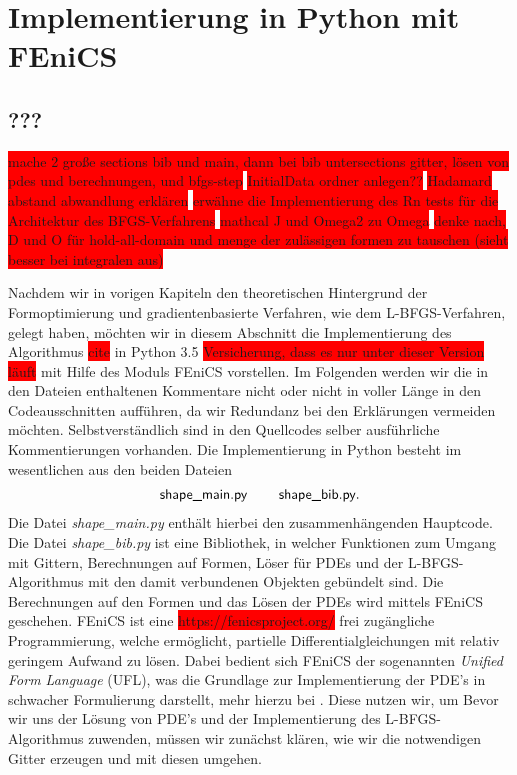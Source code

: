 
\section{Implementierung in Python mit FEniCS}
\subsection{???}

\colorbox{red}{mache 2 große sections bib und main, dann bei bib untersections gitter, lösen von pdes und berechnungen, und bfgs-step}
\colorbox{red}{InitialData ordner anlegen??}
\colorbox{red}{Hadamard abstand abwandlung erklären}
\colorbox{red}{erwähne die Implementierung des Rn tests für die Architektur des BFGS-Verfahrens}
\colorbox{red}{mathcal J und Omega2 zu Omega}
\colorbox{red}{denke nach, D und O für hold-all-domain und menge der zulässigen formen zu tauschen (sieht besser bei integralen aus)}

Nachdem wir in vorigen Kapiteln den theoretischen Hintergrund der Formoptimierung und gradientenbasierte Verfahren, wie dem L-BFGS-Verfahren, gelegt haben, möchten wir in diesem Abschnitt die Implementierung des Algorithmus \colorbox{red}{cite} in Python 3.5 \colorbox{red}{Versicherung, dass es nur unter dieser Version läuft} mit Hilfe des Moduls FEniCS vorstellen. Im Folgenden werden wir die in den Dateien enthaltenen Kommentare nicht oder nicht in voller Länge in den Codeausschnitten aufführen, da wir Redundanz bei den Erklärungen vermeiden möchten. Selbstverständlich sind in den Quellcodes selber ausführliche Kommentierungen vorhanden. Die Implementierung in Python besteht im wesentlichen aus den beiden Dateien
\begin{align*}
\textsf{shape\_main.py} \hspace{0.8cm} \textsf{shape\_bib.py}.
\end{align*}
Die Datei \textit{shape\_main.py} enthält hierbei den zusammenhängenden Hauptcode. Die Datei \textit{shape\_bib.py} ist eine Bibliothek, in welcher Funktionen zum Umgang mit Gittern, Berechnungen auf Formen, Löser für PDEs und der L-BFGS-Algorithmus mit den damit verbundenen Objekten gebündelt sind. Die Berechnungen auf den Formen und das Lösen der PDEs wird mittels FEniCS geschehen.
FEniCS ist eine \colorbox{red}{https://fenicsproject.org/} frei zugängliche Programmierung, welche ermöglicht, partielle Differentialgleichungen mit relativ geringem Aufwand zu lösen. Dabei bedient sich FEniCS der sogenannten \textit{Unified Form Language} (UFL), was die Grundlage zur Implementierung der PDE's in schwacher Formulierung darstellt, mehr hierzu bei \cite{Unifiedformlanguage}. Diese nutzen wir, um 
Bevor wir uns der Lösung von PDE's und der Implementierung des L-BFGS-Algorithmus zuwenden, müssen wir zunächst klären, wie wir die notwendigen Gitter erzeugen und mit diesen umgehen.

